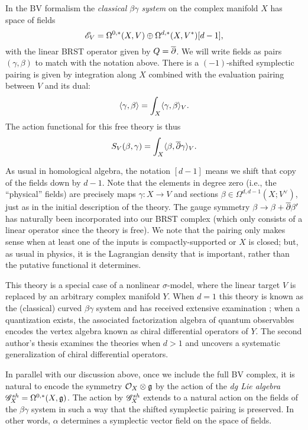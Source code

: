 \begin{dfn}
In the BV formalism the {\em classical $\beta\gamma$ system} on the complex manifold $X$ has space of fields
\[
\mathscr E_V = \Omega^{0,*}(X , V) \oplus \Omega^{d,*}(X , V^*)[d-1],
\]
with the linear BRST operator given by $Q = \overline{\partial}$.
We will write fields as pairs $(\gamma,\beta)$ to match with the notation above.
There is a $(-1)$-shifted symplectic pairing is given by integration along $X$ combined with the evaluation pairing between $V$ and its dual: 
\[
\langle\gamma, \beta\rangle = \int_X \langle\gamma, \beta\rangle_V.
\] 
The action functional for this free theory is thus
\[
S_V (\beta,\gamma) = \int_X \langle\beta, \overline{\partial} \gamma\rangle_{V} .
\]
\end{dfn}

\begin{rmk}
As usual in homological algebra, the notation $[d-1]$ means we shift that copy of the fields down by $d-1$. 
Note that the elements in degree zero (i.e., the ``physical'' fields) are precisely maps $\gamma : X \to V$ and sections $\beta \in\Omega^{d,d-1} (X ; V^\vee)$, just as in the initial description of the theory. 
The gauge symmetry $\beta \to \beta + \overline{\partial} \beta'$ has naturally been incorporated into our BRST complex (which only consists of a linear operator since the theory is free).
We note that the pairing only makes sense when at least one of the inputs is compactly-supported or $X$ is closed;
but, as usual in physics, it is the Lagrangian density that is important, rather than the putative functional it determines.
\end{rmk}


\begin{rmk}
This theory is a special case of a nonlinear $\sigma$-model, where the linear target $V$ is replaced by an arbitrary complex manifold $Y$.
When $d=1$ this theory is known as the (classical) curved $\beta\gamma$ system and has received extensive examination \cite{WittenCDO, WG2, Nek, GGW};
when a quantization exists, the associated factorization algebra of quantum observables encodes the vertex algebra known as chiral differential operators of $Y$.
The second author's thesis \cite{BWthesis} examines the theories when $d>1$ and uncovers a systematic generalization of chiral differential operators.
\end{rmk}

In parallel with our discussion above, once we include the full BV complex, 
it is natural to encode the symmetry $\mathcal O_X \otimes \mathfrak g$ by the action of  the {\em dg Lie algebra} $\mathscr G_X^{sh} = \Omega^{0,*}(X, \mathfrak g)$. 
The action by $\mathscr G_X^{sh}$ extends to a natural action on the fields of the $\beta\gamma$ system in such a way that the shifted symplectic pairing is preserved. 
In other words, $\alpha$ determines a symplectic vector field on the space of fields.

